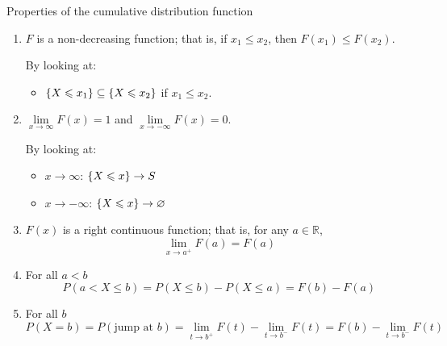 \begin{Definition}{Properties of the cumulative distribution function}{}
    \begin{enumerate}[label=(\arabic*)]
        \item $ F $ is a non-decreasing function; that is, if $ x_1\leqslant x_2 $,
              then $ F(x_1)\leqslant F(x_2) $.

              By looking at:
              \begin{itemize}
                  \item $ \{X\leqslant x_1\}\subseteq \{X\leqslant x_2\} $
                        if $ x_1\leqslant x_2 $.
              \end{itemize}
        \item $ \lim\limits_{{x} \to {\infty}} F(x)=1 $
              and $ \lim\limits_{{x} \to {-\infty}} F(x)=0 $.

              By looking at:
              \begin{itemize}
                  \item $ x\to\infty $: $ \{X\leqslant x\}\to S $
                  \item $ x\to-\infty $: $ \{X\leqslant x\}\to \varnothing $
              \end{itemize}
        \item $ F(x) $ is a right continuous function; that is,
              for any $ a\in\mathbb{R} $,
              \[ \lim\limits_{{x} \to {a^+}} F(a)=F(a) \]
        \item For all $ a<b $
              \[ P(a<X\leqslant b)=P(X\leqslant b)-P(X\leqslant a)=F(b)-F(a) \]
        \item For all $ b $
              \[ P(X=b)=P(\text{jump at }b)=\lim\limits_{{t} \to {b^+}} F(t)-
                  \lim\limits_{{t} \to {b^-}} F(t)=F(b)-\lim\limits_{{t} \to {b^-}} F(t) \]
    \end{enumerate}
\end{Definition}
